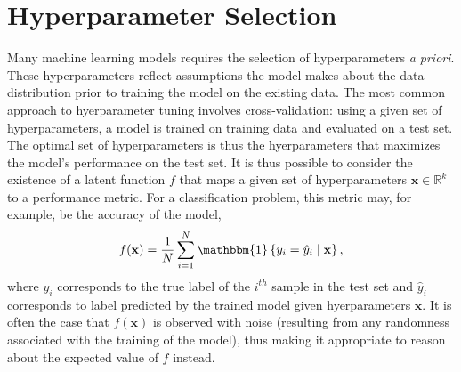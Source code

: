 \documentclass{article}
\newcommand{\R}{\mathbb{R}}
\newcommand{\x}{\mathbf{x}}
\newcommand{\set}[1]{\left\{{#1}\right\}}
\begin{document}
\section{Hyperparameter Selection}
Many machine learning models requires the selection of hyperparameters \emph{a priori}. These hyperparameters reflect assumptions the model makes about the data distribution prior to training the model on the existing data. The most common approach to hyerparameter tuning involves cross-validation: using a given set of hyperparameters, a model is trained on training data and evaluated on a test set. The optimal set of hyperparameters is thus the hyerparameters that maximizes the model's performance on the test set. It is thus possible to consider the existence of a latent function $f$ that maps a given set of hyperparameters $\x \in \R^k$ to a performance metric. For a classification problem, this metric may, for example, be the accuracy of the model,
\begin{align}
  f(\x) = \frac{1}{N} \sum_{i=1}^N \mathbbm{1}\set{y_i = \hat{y}_i \mid \x},
\end{align}
where $y_i$ corresponds to the true label of the $i^{th}$ sample in the test set and $\hat{y}_i$ corresponds to label predicted by the trained model given hyerparameters $\x$. It is often the case that $f(\x)$ is observed with noise (resulting from any randomness associated with the training of the model), thus making it appropriate to reason about the expected value of $f$ instead.
\end{document}
